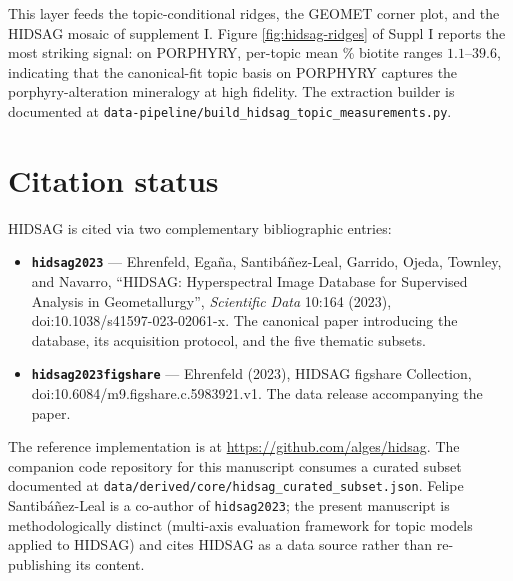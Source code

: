 \documentclass[11pt,a4paper]{article}
\begin{document}
This layer feeds the topic-conditional ridges, the GEOMET corner
plot, and the HIDSAG mosaic of supplement I. Figure
\ref{fig:hidsag-ridges} of Suppl I reports the most striking signal:
on PORPHYRY, per-topic mean \% biotite ranges $1.1$--$39.6$,
indicating that the canonical-fit topic basis on PORPHYRY captures
the porphyry-alteration mineralogy at high fidelity. The extraction
builder is documented at
\texttt{data-pipeline/build\_hidsag\_topic\_measurements.py}.

\section{Citation status}

HIDSAG is cited via two complementary bibliographic entries:

\begin{itemize}
\item \textbf{\texttt{hidsag2023}} --- Ehrenfeld, Egaña,
Santibáñez-Leal, Garrido, Ojeda, Townley, and Navarro,
``HIDSAG: Hyperspectral Image Database for Supervised Analysis in
Geometallurgy'', \emph{Scientific Data} 10:164 (2023),
doi:10.1038/s41597-023-02061-x. The canonical paper introducing the
database, its acquisition protocol, and the five thematic subsets.
\item \textbf{\texttt{hidsag2023figshare}} --- Ehrenfeld (2023),
HIDSAG figshare Collection,
doi:10.6084/m9.figshare.c.5983921.v1. The data release accompanying
the paper.
\end{itemize}

The reference implementation is at \url{https://github.com/alges/hidsag}.
The companion code repository for this manuscript consumes a curated
subset documented at
\texttt{data/derived/core/hidsag\_curated\_subset.json}. Felipe
Santibáñez-Leal is a co-author of \texttt{hidsag2023}; the present
manuscript is methodologically distinct (multi-axis evaluation
framework for topic models applied to HIDSAG) and cites HIDSAG as a
data source rather than re-publishing its content.



\end{document}
